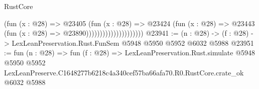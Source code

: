 \begin{lexlean}{RustCore}
\begin{coremodule}
                                      (fun (x : @28) =>
                                      @23405
                                        (fun (x : @28) =>
                                        @23424
                                          (fun (x : @28) =>
                                          @23443 (fun (x : @28) => @23890)))))))))))))))))))))
@23941 := (n : @28) -> (f : @28) -> LexLeanPreservation.Rust.FunSem @5948 @5950 @5952 @6032 @5988
@23951 := fun (n : @28) =>
  fun (f : @28) =>
  LexLeanPreservation.Rust.simulate
    @5948
    @5950
    @5952
    LexLeanPreserve.C1648277b6218c4a340cef57ba66afa70.R0.RustCore.crate_ok
    @6032
    @5988
\end{coremodule}
\end{lexlean}
